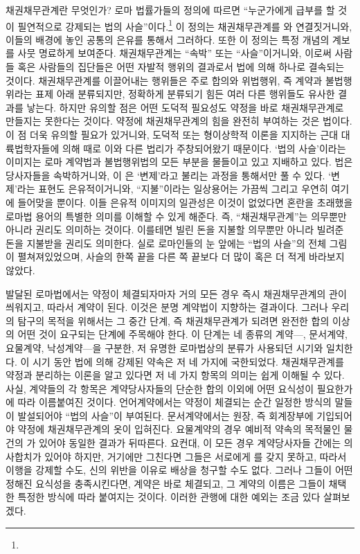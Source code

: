 채권채무관계란 무엇인가?
로마 법률가들의 정의에 따르면
``누군가에게 급부를 할 것이 필연적으로 강제되는
법의 사슬''이다.\footnote{%
   }
이 정의는
채권채무관계를 와 연결짓거니와,
이들의 배경에 놓인 공통의 은유를 통해서 그러하다.
또한 이 정의는
특정 개념의 계보를 사뭇 명료하게 보여준다.
채권채무관계는 ``속박'' 또는 ``사슬''이거니와,
이로써
사람들 혹은 사람들의 집단들은
어떤 자발적 행위의 결과로서
법에 의해 하나로 결속되는 것이다.
채권채무관계를 이끌어내는 행위들은 주로
합의와 위법행위, 즉
계약과 불법행위라는 표제 아래 분류되지만,
정확하게 분류되기 힘든 여러 다른 행위들도 유사한 결과를 낳는다.
하지만 유의할 점은
어떤 도덕적 필요성도 약정을 바로 채권채무관계로 만들지는 못한다는 것이다.
약정에 채권채무관계의 힘을 완전히 부여하는 것은 법이다.
이 점 더욱 유의할 필요가 있거니와,
도덕적 또는 형이상학적 이론을 지지하는 근대 대륙법학자들에 의해
때로 이와 다른 법리가 주창되어왔기 때문이다.
`법의 사슬'이라는 이미지는
로마 계약법과 불법행위법의 모든 부분을 물들이고 있고 지배하고 있다.
법은 당사자들을 속박하거니와,
이 은 `변제'라고 불리는 과정을
통해서만 풀 수 있다.
`변제'라는 표현도 은유적이거니와,
``지불''이라는 일상용어는 가끔씩 그리고 우연히
여기에 들어맞을 뿐이다.
이들 은유적 이미지의 일관성은
이것이 없었다면 혼란을 초래했을
로마법 용어의 특별한 의미를 이해할 수 있게 해준다.
즉, ``채권채무관계''는 의무뿐만 아니라
권리도 의미하는 것이다.
이를테면 빌린 돈을 지불할 의무뿐만 아니라
빌려준 돈을 지불받을 권리도 의미한다.
실로 로마인들의 눈 앞에는 ``법의 사슬''의 전체 그림이
펼쳐져있었으며,
사슬의 한쪽 끝을 다른 쪽 끝보다 더 많이 혹은 더 적게
바라보지 않았다.

발달된 로마법에서는
약정이 체결되자마자 거의 모든 경우
즉시
채권채무관계의 관이 씌워지고, 따라서 계약이 된다.
이것은 분명 계약법이 지향하는 결과이다.
그러나 우리의 탐구의 목적을 위해서는
그 중간 단계, 즉 채권채무관계가 되려면 완전한 합의 이상의 어떤 것이
요구되는 단계에 주목해야 한다.
이 단계는
네 종류의 계약---, 문서계약, 요물계약, 낙성계약---을 구분한,
저 유명한 로마법상의 분류가 사용되던 시기와 일치한다.
이 시기 동안 법에 의해 강제된 약속은 저 네 가지에 국한되었다.
채권채무관계를 약정과 분리하는 이론을 알고 있다면
저 네 가지 항목의 의미는
쉽게 이해될 수 있다.
사실,
계약들의 각 항목은
계약당사자들의 단순한 합의 이외에 어떤 요식성이 필요한가에 따라
이름붙여진 것이다.
언어계약에서는 약정이 체결되는 순간
일정한 방식의 말들이 발설되어야 ``법의 사슬''이 부여된다.
문서계약에서는
원장, 즉 회계장부에 기입되어야
약정에 채권채무관계의 옷이 입혀진다.
요물계약의 경우
예비적 약속의 목적물인
물건의 가 있어야 동일한 결과가 뒤따른다.
요컨대,
이 모든 경우
계약당사자들 간에는 의사합치가 있어야 하지만,
거기에만 그친다면 그들은 서로에게 를 갖지 못하고,
따라서 이행을 강제할 수도,
신의 위반을 이유로 배상을 청구할 수도 없다.
그러나 그들이 어떤 정해진 요식성을 충족시킨다면,
계약은 바로 체결되고,
그 계약의 이름은 그들이 채택한 특정한 방식에 따라 붙여지는 것이다.
이러한 관행에 대한 예외는 조금 있다 살펴보겠다.

